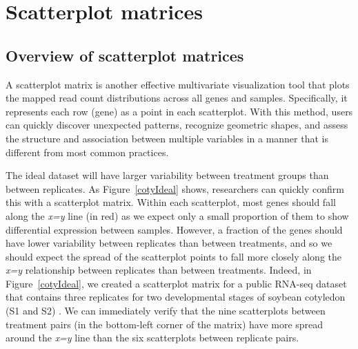 \documentclass{bioinfo}
\begin{document}
\section{Scatterplot matrices}

\subsection{Overview of scatterplot matrices}

A scatterplot matrix is another effective multivariate visualization tool that plots the mapped read count distributions across all genes and samples. Specifically, it represents each row (gene) as a point in each scatterplot. With this method, users can quickly discover unexpected patterns, recognize geometric shapes, and assess the structure and association between multiple variables in a manner that is different from most common practices. 

The ideal dataset will have larger variability between treatment groups than between replicates. As Figure~\ref{cotyIdeal} shows, researchers can quickly confirm this with a scatterplot matrix. Within each scatterplot, most genes should fall along the \textit{x=y} line (in red) as we expect only a small proportion of them to show differential expression between samples. However, a fraction of the genes should have lower variability between replicates than between treatments, and so we should expect the spread of the scatterplot points to fall more closely along the \textit{x=y} relationship between replicates than between treatments. Indeed, in Figure~\ref{cotyIdeal}, we created a scatterplot matrix for a public RNA-seq dataset that contains three replicates for two developmental stages of soybean cotyledon (S1 and S2) \citep{Brown}. We can immediately verify that the nine scatterplots between treatment pairs (in the bottom-left corner of the matrix) have more spread around the \textit{x=y} line than the six scatterplots between replicate pairs.
\end{document}
